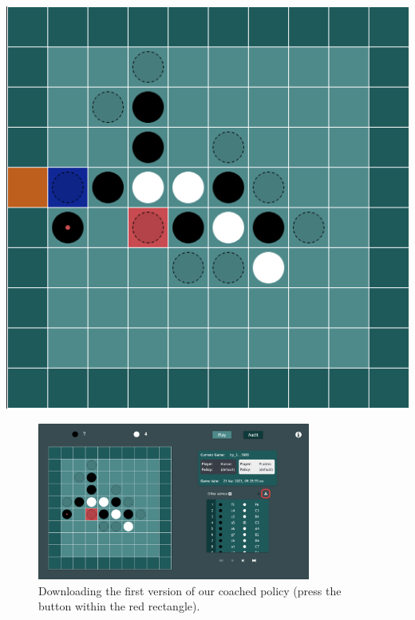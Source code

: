 \documentclass[a4paper,11pt]{article}
\theoremstyle{definition}
\theoremstyle{remark}
\numberwithin{equation}{section}
\begin{document}
	\begin{minipage}[c]{0.35\textwidth}
		\includegraphics[width = \textwidth]{../assets/advice_001.png}
		\label{fig:101}
	\end{minipage}

	\begin{figure}[!htb]
		\centering
		\includegraphics[width = 0.8\textwidth]{../assets/download_coached_policy.png}
		\caption{Downloading the first version of our coached policy (press the button within the red rectangle).}
		\label{fig:102}
	\end{figure}
\end{document}
